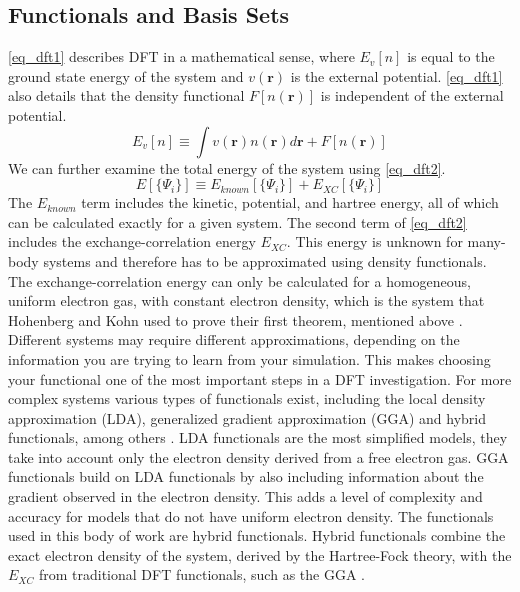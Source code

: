 \subsection{Functionals and Basis Sets}
\autoref{eq_dft1} describes DFT in a mathematical sense, where $E_{v}[n]$ is equal to the ground state energy of the system and $v(\textbf{r})$ is the external potential. \autoref{eq_dft1} also details that the density functional $F[n(\textbf{r})]$ is independent of the external potential. 
\begin{equation}
    E_{v}[n] \equiv \int v(\textbf{r}) n(\textbf{r})d\textbf{r} + F[n(\textbf{r})]
    \label{eq_dft1}
\end{equation}
We can further examine the total energy of the system using \autoref{eq_dft2}. 
\begin{equation}
    E[\{\Psi_i\}] \equiv E_{known} [\{ \Psi_i \}] + E_{XC} [\{\Psi_i\}]
    \label{eq_dft2}
\end{equation}
The $E_{known}$ term includes the kinetic, potential, and hartree energy, all of which can be calculated exactly for a given system. The second term of \autoref{eq_dft2} includes the exchange-correlation energy $E_{XC}$. This energy is unknown for many-body systems and therefore has to be approximated using density functionals. The exchange-correlation energy can only be calculated for a homogeneous, uniform electron gas, with constant electron density, which is the system that Hohenberg and Kohn used to prove their first theorem, mentioned above \citep{hohenberg_inhomogeneous_1964}. Different systems may require different approximations, depending on the information you are trying to learn from your simulation. This makes choosing your functional one of the most important steps in a DFT investigation. For more complex systems various types of functionals exist, including the local density approximation (LDA), generalized gradient approximation (GGA) and hybrid functionals, among others \citep{goh_exchange-correlation_nodate, hasnip_density_2014}. LDA functionals are the most simplified models, they take into account only the electron density derived from a free electron gas. GGA functionals build on LDA functionals by also including information about the gradient observed in the electron density. This adds a level of complexity and accuracy for models that do not have uniform electron density. The functionals used in this body of work are hybrid functionals. Hybrid functionals combine the exact electron density of the system, derived by the Hartree-Fock theory, with the $E_{XC}$ from traditional DFT functionals, such as the GGA \citep{hybrid_2007, Heda_2023}. 
